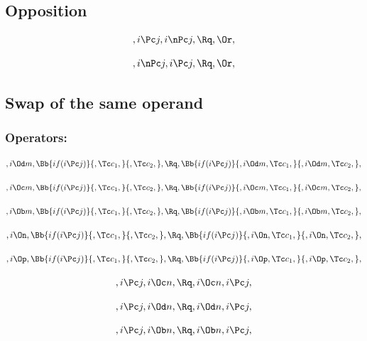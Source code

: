 \bigskip
\bigskip
\bigskip
\bigskip
\subsection{ Opposition}
\[,i \Pc j, i \nPc j, \Rq , \Or,\]


\[,i \nPc j, i \Pc j, \Rq , \Or,\]




\bigskip
\bigskip
\bigskip
\bigskip
\subsection{ Swap  of the same operand}


\subsubsection{Operators:} 
\[, i \Od m, \Bb{if(i \Pc j)}{, \Tc c_1,}{, \Tc c_2,}, \Rq , \Bb{if(i \Pc j)}{,i \Od m, \Tc c_1,}{,i \Od m, \Tc c_2,},\]


\bigskip
\bigskip
\[, i \Oc m, \Bb{if(i \Pc j)}{, \Tc c_1,}{, \Tc c_2,}, \Rq , \Bb{if(i \Pc j)}{,i \Oc m, \Tc c_1,}{,i \Oc m, \Tc c_2,},\]

\bigskip
\bigskip
\[, i \Ob m, \Bb{if(i \Pc j)}{, \Tc c_1,}{, \Tc c_2,}, \Rq , \Bb{if(i \Pc j)}{,i \Ob m, \Tc c_1,}{,i \Ob m, \Tc c_2,},\]

\bigskip
\bigskip
\[, i \On, \Bb{if(i \Pc j)}{, \Tc c_1,}{, \Tc c_2,}, \Rq , \Bb{if(i \Pc j)}{,i \On, \Tc c_1,}{,i \On, \Tc c_2,},\]

\bigskip
\bigskip
\[, i \Op, \Bb{if(i \Pc j)}{, \Tc c_1,}{, \Tc c_2,}, \Rq , \Bb{if(i \Pc j)}{,i \Op, \Tc c_1,}{,i \Op, \Tc c_2,},\]


\bigskip
\bigskip

\[, i \Pc j, i \Oc n, \Rq , i \Oc n, i \Pc j,\]

\[, i \Pc j, i \Od n, \Rq , i \Od n, i \Pc j,\]

\[, i \Pc j, i \Ob n, \Rq , i \Ob n, i \Pc j,\]

